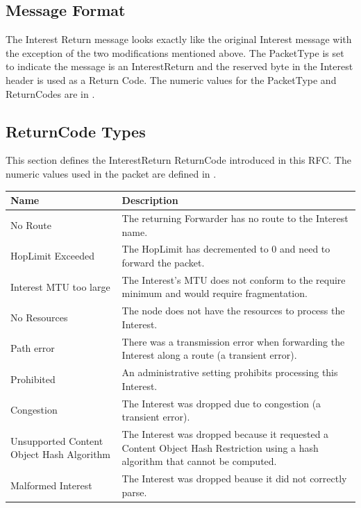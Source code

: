 \documentclass[12pt]{article}
\begin{document}
\subsection{Message Format}
The Interest Return message looks exactly like the original Interest
message with the exception of the two modifications mentioned above.
The PacketType is set to indicate the message is an InterestReturn
and the reserved byte in the Interest header is used as a Return
Code.  The numeric values for the PacketType and ReturnCodes are in
\cite{messages}.

\subsection{ReturnCode Types}
This section defines the InterestReturn ReturnCode introduced in this
RFC.  The numeric values used in the packet are defined in
\cite{messages}.

\begin{table}[t!]
\center
\begin{tabular}{|p{5cm}|p{9cm}|} \hline
{\bf Name} & {\bf Description} \\ \hline
No Route & The returning Forwarder has no route to the Interest name. \\
HopLimit Exceeded & The HopLimit has decremented to 0 and need to forward the packet. \\
Interest MTU too large & The Interest's MTU does not conform to the require minimum and would require fragmentation. \\
No Resources & The node does not have the resources to process the Interest. \\
Path error & There was a transmission error when forwarding the Interest along a route (a transient error). \\
Prohibited & An administrative setting prohibits processing this Interest. \\
Congestion & The Interest was dropped due to congestion (a transient error). \\
Unsupported Content Object Hash Algorithm & The Interest was dropped because it requested a Content Object Hash Restriction using a hash algorithm that cannot be computed. \\
Malformed Interest & The Interest was dropped beause it did not correctly parse. \\ \hline
\end{tabular}
\end{table}
\end{document}
